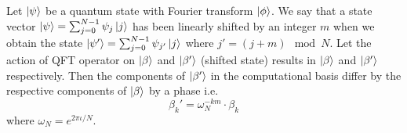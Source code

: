 \begin{theorem}
Let \( \ket{\psi} \) be a quantum state with Fourier transform \( \ket{\phi} \). We say that a state vector $\ket{\psi} =\sum_{j=0}^{N-1} \psi_j \ket{j}$ has been linearly shifted by an integer $m$ when we obtain the state $\ket{\psi'} = \sum_{j=0}^{N-1} \psi_{j'} \ket{j}$ where $j' = (j+m)\mod N$. Let the action of QFT operator on $\ket{\beta}$ and $\ket{\beta'}$ (shifted state) results in $\ket{\beta}$ and $\ket{\beta'}$ respectively. Then the components of $\ket{\beta'}$ in the computational basis differ by the respective components of $\ket{\beta}$ by a phase i.e.
\begin{equation}
\beta_k' =\omega_N^{-km}\cdot \beta_k
\end{equation}
where $\omega_N=e^{2\pi\iota /N}$.
\end{theorem}
